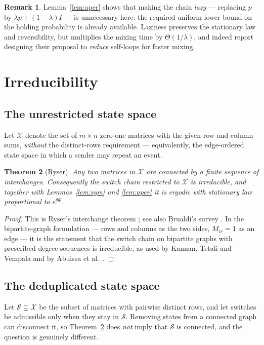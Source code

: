 \documentclass[11pt]{article}
\newtheorem{theorem}{Theorem}
\theoremstyle{definition}
\newtheorem{remark}[theorem]{Remark}
\newcommand{\Xcal}{\mathcal{X}}
\newcommand{\Scal}{\mathcal{S}}
\begin{document}
\begin{remark}
Lemma~\ref{lem:aper} shows that making the chain \emph{lazy} --- replacing $p$
by $\lambda p+(1-\lambda)I$ --- is unnecessary here: the required uniform lower
bound on the holding probability is already available. Laziness preserves the
stationary law and reversibility, but multiplies the mixing time by
$\Theta(1/\lambda)$, and \cite{dinghy} indeed report designing their proposal to
\emph{reduce} self-loops for faster mixing.
\end{remark}

\section{Irreducibility}

\subsection{The unrestricted state space}

Let $\Xcal$ denote the set of $m\times n$ zero-one matrices with the given row
and column sums, \emph{without} the distinct-rows requirement --- equivalently,
the edge-ordered state space in which a sender may repeat an event.

\begin{theorem}[Ryser]\label{thm:ryser}
Any two matrices in $\Xcal$ are connected by a finite sequence of interchanges.
Consequently the switch chain restricted to $\Xcal$ is irreducible, and together
with Lemmas~\ref{lem:sym} and \ref{lem:aper} it is ergodic with stationary law
proportional to $e^{\theta\Phi}$.
\end{theorem}

\begin{proof}
This is Ryser's interchange theorem \cite{ryser1957}; see also Brualdi's survey
\cite{brualdi1980}. In the bipartite-graph formulation --- rows and columns as
the two sides, $M_{ir}=1$ as an edge --- it is the statement that the switch
chain on bipartite graphs with prescribed degree sequences is irreducible, as
used by Kannan, Tetali and Vempala \cite{ktv1999} and by
Abuissa et al.~\cite{dinghy}.
\end{proof}

\subsection{The deduplicated state space}

Let $\Scal\subsetneq\Xcal$ be the subset of matrices with pairwise distinct
rows, and let switches be admissible only when they stay in $\Scal$. Removing
states from a connected graph can disconnect it, so Theorem~\ref{thm:ryser}
does \emph{not} imply that $\Scal$ is connected, and the question is genuinely
different.
\end{document}
